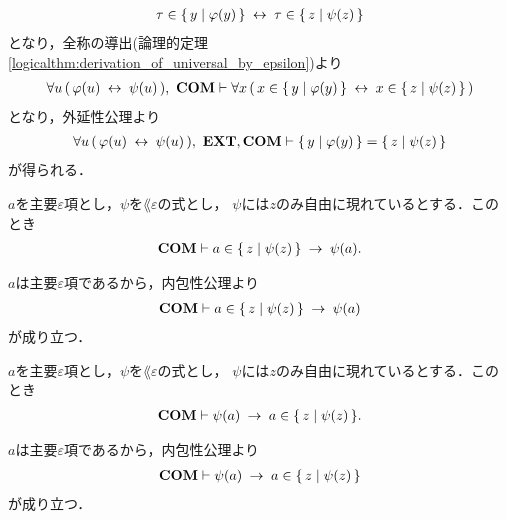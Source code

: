 \begin{sketch}
\begin{align}
			\tau \in \{\, y \mid \varphi(y)\, \} \hspace{0.25em}\leftrightarrow\hspace{0.25em} \tau \in \{\, z \mid \psi(z)\, \}
		\end{align}
		となり，全称の導出(論理的定理\ref{logicalthm:derivation_of_universal_by_epsilon})より
		\begin{align}
			\forall u\, (\, \varphi(u) \hspace{0.25em}\leftrightarrow\hspace{0.25em} \psi(u)\, ),\ \mbox{\bf COM} \vdash
			\forall x\, (\, x \in \{\, y \mid \varphi(y)\, \} \hspace{0.25em}\leftrightarrow\hspace{0.25em} x \in \{\, z \mid \psi(z)\, \}\, )
		\end{align}
		となり，外延性公理より
		\begin{align}
			\forall u\, (\, \varphi(u) \lrarrow \psi(u)\, ),\ \EXTAX,\COMAX \vdash
			\Set{y}{\varphi(y)} = \Set{z}{\psi(z)}
		\end{align}
		が得られる．
		\QED
	\end{sketch}
	
	\begin{screen}
		\begin{thm}
		\label{thm:equivalent_formula_rewriting_7}
			$a$を主要$\varepsilon$項とし，$\psi$を$\lang{\varepsilon}$の式とし，
			$\psi$には$z$のみ自由に現れているとする．このとき
			\begin{align}
				\mbox{\bf COM} \vdash a \in \{\, z \mid \psi(z)\, \} \hspace{0.25em}\rightarrow\hspace{0.25em} \psi(a).
			\end{align}
		\end{thm}
	\end{screen}
	
	\begin{sketch}
		$a$は主要$\varepsilon$項であるから，内包性公理より
		\begin{align}
			\mbox{\bf COM} \vdash a \in \{\, z \mid \psi(z)\, \} \hspace{0.25em}\rightarrow\hspace{0.25em} \psi(a)
		\end{align}
		が成り立つ．
		\QED
	\end{sketch}
	
	\begin{screen}
		\begin{thm}
		\label{thm:equivalent_formula_rewriting_8}
			$a$を主要$\varepsilon$項とし，$\psi$を$\lang{\varepsilon}$の式とし，
			$\psi$には$z$のみ自由に現れているとする．このとき
			\begin{align}
				\mbox{\bf COM} \vdash \psi(a) \hspace{0.25em}\rightarrow\hspace{0.25em} a \in \{\, z \mid \psi(z)\, \}.
			\end{align}
		\end{thm}
	\end{screen}
	
	\begin{sketch}
		$a$は主要$\varepsilon$項であるから，内包性公理より
		\begin{align}
			\mbox{\bf COM} \vdash \psi(a) \hspace{0.25em}\rightarrow\hspace{0.25em} a \in \{\, z \mid \psi(z)\, \}
		\end{align}
		が成り立つ．
		\QED
	\end{sketch}
	
